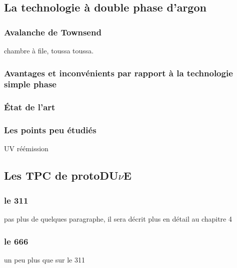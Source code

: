         \subsection{La technologie à double phase d'argon}
            \subsubsection{Avalanche de Townsend}
                chambre à file, toussa toussa.
            \subsubsection{Avantages et inconvénients par rapport à la technologie simple phase}\label{sec::townsend_avalanche}
            \subsubsection{État de l'art}
            \subsubsection{Les points peu étudiés}
                UV réémission
        
        \subsection{Les TPC de \texorpdfstring{protoDU$\nu$E}{protoDUNE}}
            \subsubsection{le 311}
                pas plus de quelques paragraphe, il sera décrit plus en détail au chapitre 4
            \subsubsection{le 666}
                un peu plus que sur le 311